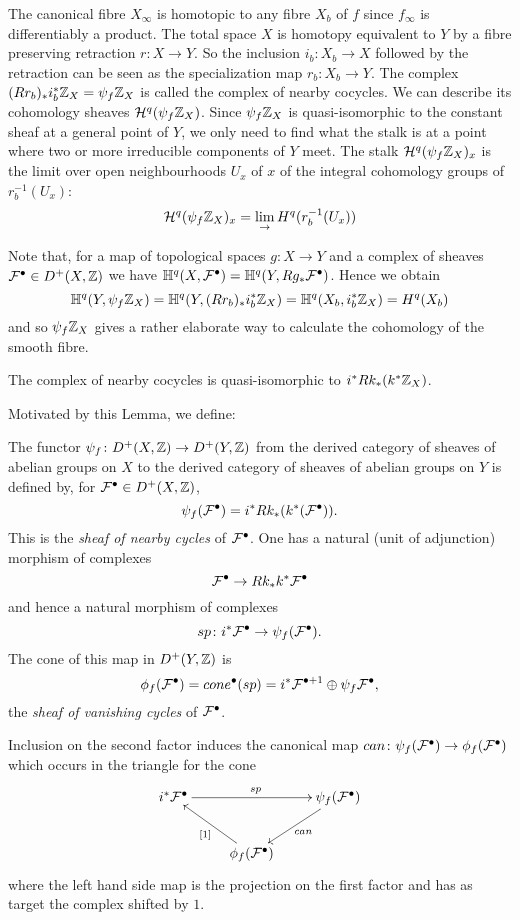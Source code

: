 \documentclass[../main.tex]{subfiles}
\begin{document}
The canonical fibre $X_{\infty}$ is homotopic to any fibre $X_b$ of $f$ since $f_{\infty}$ is differentiably a product. The total space $X$ is homotopy equivalent to $Y$ by a
fibre preserving retraction $r \colon X \to Y$. So the inclusion $i_b \colon X_b \to X$ followed by the retraction can be seen as the specialization map $r_b \colon X_b \to Y$.
The complex $(Rr_b)_* i_b^*\mathbb{Z}_X = \psi_f \mathbb{Z}_X$ is called the complex of nearby cocycles. 
We can describe its cohomology sheaves $\mathcal{H}^q(\psi_f \mathbb{Z}_X)$. Since $\psi_f \mathbb{Z}_X$ is quasi-isomorphic to the constant sheaf at a general point of $Y$, we only need to find what the stalk is at a point where two or more irreducible components of $Y$ meet. The stalk $\mathcal{H}^q(\psi_f \mathbb{Z}_X)_x$ is the limit over open neighbourhoods $U_x$ of $x$ of the integral cohomology groups of $r_b^{-1}(U_x)$:
\begin{equation} \label{cohomologysheaves}
\mathcal{H}^q(\psi_f \mathbb{Z}_X)_x= \lim_{\to} H^q(r_b^{-1}(U_x))
\end{equation}

Note that, for a map of topological spaces $g \colon X \to Y$ and a complex of sheaves $\mathcal{F}^\bullet \in D^+(X,\mathbb{Z})$ we have $\mathbb{H}^q(X, \mathcal{F}^\bullet) =\mathbb{H}^q(Y,Rg_*\mathcal{F}^\bullet)  $.
Hence we obtain
\[
\mathbb{H}^q(Y,\psi_f \mathbb{Z}_X) = \mathbb{H}^q(Y,(Rr_b)_* i_b^*\mathbb{Z}_X ) = \mathbb{H}^q(X_b, i_b^*\mathbb{Z}_X ) = H^q(X_b)
\]
and so $\psi_f \mathbb{Z}_X$ gives a rather elaborate way to calculate the cohomology of the smooth fibre.

\begin{lemma}\textup{\cite[Lemma 11.12]{PS08}} \label{quasiisonearby}
    The complex of nearby cocycles is quasi-isomorphic to
$i^*Rk_*(k^* \mathbb{Z}_X)$.
\end{lemma} 
Motivated by this Lemma, we define:
\begin{defn} \label{defNearbyVanishing}
    The functor $\psi_f \colon D^+(X,\mathbb{Z}) \to D^+(Y, \mathbb{Z})$ from the derived category of sheaves of abelian groups on $X$ to the derived category of sheaves of abelian groups on $Y$
is defined by, for $\mathcal{F}^\bullet \in D^+(X, \mathbb{Z})$,
\[
\psi_f (\mathcal{F}^\bullet) = i^* Rk_*(k^*(\mathcal{F}^\bullet)).
\]
This is the \emph{sheaf of nearby cycles} of $\mathcal{F}^\bullet$. 
One has a natural (unit of adjunction) morphism of complexes
\[
\mathcal{F}^\bullet \to Rk_*k^*\mathcal{F}^\bullet
\]
and hence a natural morphism of complexes
\[
sp \colon i^*\mathcal{F}^\bullet \to \psi_f (\mathcal{F}^\bullet).
\]
The cone of this map in $D^+(Y, \mathbb{Z})$ is 
\[
\phi_f (\mathcal{F}^\bullet) = cone^\bullet(sp) = i^*\mathcal{F}^{\bullet+1} \oplus \psi_f \mathcal{F}^\bullet,
\]
the \emph{sheaf of vanishing cycles} of  $\mathcal{F}^\bullet$.
\end{defn} 
Inclusion on the second factor induces the canonical map $can \colon \psi_f (\mathcal{F}^\bullet) \to \phi_f (\mathcal{F}^\bullet)$
which occurs in the triangle for the cone
\[
\xymatrix{
i^*\calF^\bullet \ar[rr]^{sp} && \psi_f (\calF^\bullet)  \ar[dl]^{can}  \\
&\phi_f (\calF^\bullet) \ar[ul]^{[1]}  &
}
\]
where the left hand side map is the projection on the first factor and has as target the complex shifted by $1$.
\end{document}
